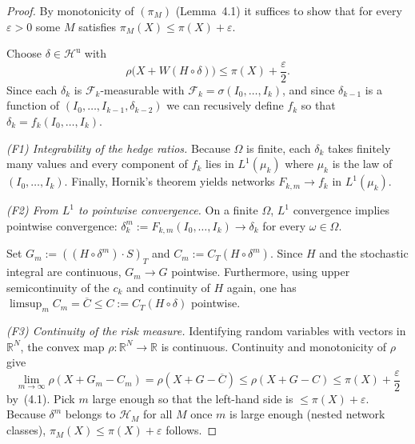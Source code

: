 \documentclass[11pt,a4paper]{report}
\numberwithin{equation}{chapter}
\theoremstyle{plain}
\theoremstyle{definition}
\newcommand{\R}{\mathbb{R}}
\newcommand{\F}{\mathcal{F}}
\newcommand{\HH}{\mathcal{H}}
\newcommand{\Hu}{\mathcal{H}^{\mathrm{u}}}
\begin{document}
\begin{proof}
  By monotonicity of $(\pi_M)$ (Lemma~4.1) it suffices to
  show that for every $\varepsilon>0$ some $M$ satisfies
  $\pi_M(X)\le\pi(X)+\varepsilon$.

  Choose $\delta\in\Hu$ with
  \begin{equation}\label{eq:finitespace:nearopt}
    \rho\bigl(X+W(H\circ\delta)\bigr)\le\pi(X)+\frac{\varepsilon}{2}.
  \end{equation}
  Since each $\delta_k$ is $\F_k$-measurable with
  $\F_k=\sigma(I_0,\dots,I_k)$, and since $\delta_{k-1}$ is a
  function of $(I_0,\dots,I_{k-1}, \delta_{k-2})$ we can recusively define $f_k$ so that
  $\delta_k=f_k(I_0,\dots,I_k)$.

  \indent\textit{(F1) Integrability of the hedge ratios.}
  Because $\Omega$ is finite, each $\delta_k$ takes finitely many values
  and every component of $f_k$ lies in $L^1(\mu_k)$ where $\mu_k$ is the law of
  $(I_0,\dots,I_k)$. Finally, Hornik's theorem yields networks
  $F_{k,m}\to f_k$ in $L^1(\mu_k)$.

  \indent\textit{(F2) From $L^1$ to pointwise convergence.}
  On a finite $\Omega$, $L^1$ convergence implies pointwise convergence:
  $\delta^m_k:=F_{k,m}(I_0,\dots,I_k)\to\delta_k$ for every
  $\omega\in\Omega$.

  \indent Set $G_m:=((H\circ\delta^m)\cdot S)_T$ and $C_m:=C_T(H\circ\delta^m)$.
  Since $H$ and the stochastic integral are continuous, $G_m\to G$ pointwise.
  Furthermore, using upper semicontinuity of the $c_k$ and continuity of $H$ again,
  one has $\limsup_m C_m=\overline C\le C:=C_T(H\circ\delta)$ pointwise.

  \indent\textit{(F3) Continuity of the risk measure.}
  Identifying random variables with vectors in $\R^N$, the convex
  map $\rho:\R^N\to\R$ is continuous. Continuity and
  monotonicity of $\rho$ give
  \[
    \lim_{m\to\infty}\rho(X+G_m-C_m)=\rho(X+G-\overline C)
    \le\rho(X+G-C)\le\pi(X)+\frac{\varepsilon}{2}
  \]
  by~(4.1). Pick $m$ large enough so that the
  left-hand side is $\le\pi(X)+\varepsilon$. Because $\delta^m$ belongs
  to $\HH_M$ for all $M$ once $m$ is large enough (nested network
  classes), $\pi_M(X)\le\pi(X)+\varepsilon$ follows.
\end{proof}
\end{document}
